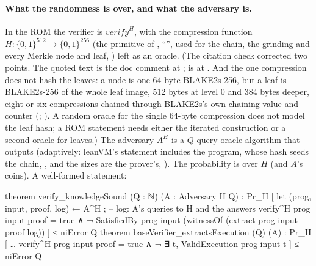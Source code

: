 \paragraph{What the randomness is over, and what the adversary is.} In the ROM the verifier is
$\mathit{verify}^H$,  with the compression function $H : \{0,1\}^{512} → \{0,1\}^{256}$
(the primitive of , ``'', used for the chain, the
grinding and every Merkle node and leaf, ) left as an oracle. (The citation
check corrected two points. The quoted text is the doc comment at ;
 is at . And the one compression does not hash the leaves: a node is one
64-byte BLAKE2s-256, but a leaf is BLAKE2s-256 of the whole leaf image, 512 bytes at level 0 and 384
bytes deeper, eight or six compressions chained through BLAKE2s's own chaining value and counter
(; ). A random oracle for the
single 64-byte compression does not model the leaf hash; a ROM statement needs either the iterated
construction or a second oracle for leaves.) The adversary
$A^H$ is a $Q$-query oracle algorithm that outputs  (adaptively: leanVM's
statement includes the program, whose hash seeds the chain, , and the sizes are
the prover's, ). The probability is over $H$ (and $A$'s coins). A well-formed
statement:

\begin{leancode}
theorem verify_knowledgeSound (Q : ℕ) (A : Adversary H Q) :
  Pr_H [ let (prog, input, proof, log) ← A^H ;           -- log: A's queries to H and the answers
         verify^H prog input proof = true ∧
         ¬ SatisfiedBy prog input (witnessOf (extract prog input proof log)) ]
    ≤ niError Q
theorem baseVerifier_extractsExecution (Q) (A) :
  Pr_H [ … verify^H prog input proof = true ∧ ¬ ∃ t, ValidExecution prog input t ] ≤ niError Q
\end{leancode}

